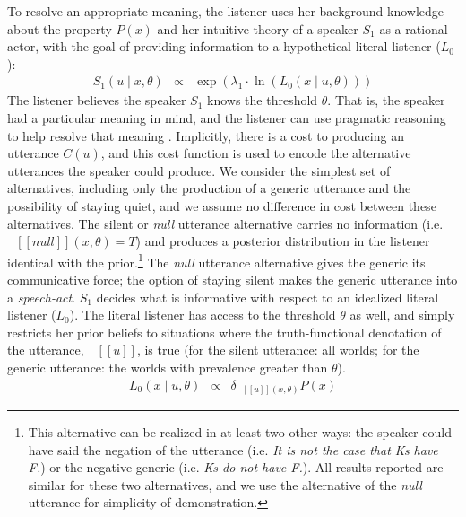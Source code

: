 \documentclass[12pt,letterpaper]{article}
\newcommand{\denote}[1]{\mbox{ $[\![ #1 ]\!]$}}
\begin{document}
To resolve an appropriate meaning, the listener uses her background knowledge about the property $P(x)$ and her intuitive theory of a speaker $S_1$ as a rational actor, with the goal of providing information to a hypothetical literal listener ($L_0$):
\begin{eqnarray}
S_{1}(u \mid x, \theta) &\propto& \exp{(\lambda_1 \cdot \ln  ( {L_{0}(x \mid u, \theta)} ) ) }\label{eq:S1}
\end{eqnarray}
%
The listener believes the speaker $S_1$ knows the threshold $\theta$.
That is, the speaker had a particular meaning in mind, and the listener can use pragmatic reasoning to help resolve that meaning \cite{Lassiter2013, Lassiter2015, GoodmanLassiter}. 
Implicitly, there is a cost to producing an utterance $C(u)$, and this cost function is used to encode the alternative utterances the speaker could produce. 
We consider the simplest set of alternatives, including only the production of a generic utterance and the possibility of staying quiet, and we assume no difference in cost between these alternatives. 
The silent or \emph{null} utterance alternative carries no information (i.e.~$\denote{null}(x, \theta)=T$) and produces a posterior distribution in the listener identical with the prior.\footnote{
This alternative can be realized in at least two other ways: the speaker could have said the negation of the utterance (i.e. \emph{It is not the case that Ks have F.}) or the negative generic (i.e. \emph{Ks do not have F.}). All results reported are similar for these two alternatives, and we use the alternative of the \emph{null} utterance for simplicity of demonstration.
}
The \emph{null} utterance alternative gives the generic its communicative force; the option of staying silent makes the generic utterance into a \emph{speech-act}.
%
%
%
$S_1$ decides what is informative with respect to an idealized literal listener ($L_{0}$).
The literal listener has access to the threshold $\theta$ as well, and simply restricts her prior beliefs to situations where the truth-functional denotation of the utterance, $\denote{u}$, is true (for the silent utterance: all worlds; for the generic utterance: the worlds with prevalence greater than $\theta$).
%
\begin{eqnarray}
L_{0}(x \mid u, \theta) &\propto& {\delta_{\denote{u}(x, \theta)} P(x)} \label{eq:L0}
\end{eqnarray}
%
\end{document}
